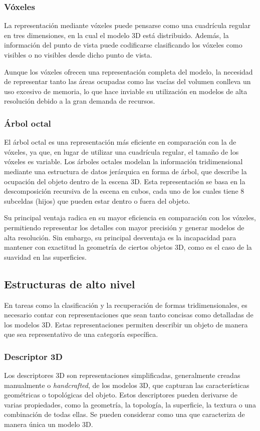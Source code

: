 \subsubsection{Vóxeles}
La representación mediante vóxeles puede pensarse como una cuadrícula regular en tres dimensiones, en la cual el modelo 3D está distribuido. Además, la información del punto de vista puede codificarse clasificando los vóxeles como visibles o no visibles desde dicho punto de vista.

Aunque los vóxeles ofrecen una representación completa del modelo, la necesidad de representar tanto las áreas ocupadas como las vacías del volumen conlleva un uso excesivo de memoria, lo que hace inviable su utilización en modelos de alta resolución debido a la gran demanda de recursos.

\subsubsection{Árbol octal}
El árbol octal es una representación más eficiente en comparación con la de vóxeles, ya que, en lugar de utilizar una cuadrícula regular, el tamaño de los vóxeles es variable. Los árboles octales modelan la información tridimensional mediante una estructura de datos jerárquica en forma de árbol, que describe la ocupación del objeto dentro de la escena 3D. Esta representación se basa en la descomposición recursiva de la escena en cubos, cada uno de los cuales tiene 8 subceldas (hijos) que pueden estar dentro o fuera del objeto.

Su principal ventaja radica en su mayor eficiencia en comparación con los vóxeles, permitiendo representar los detalles con mayor precisión y generar modelos de alta resolución. Sin embargo, su principal desventaja es la incapacidad para mantener con exactitud la geometría de ciertos objetos 3D, como es el caso de la suavidad en las superficies.

\subsection{Estructuras de alto nivel}
En tareas como la clasificación y la recuperación de formas tridimensionales, es necesario contar con representaciones que sean tanto concisas como detalladas de los modelos 3D. Estas representaciones permiten describir un objeto de manera que sea representativo de una categoría específica.

\subsubsection{Descriptor 3D}
Los descriptores 3D son representaciones simplificadas, generalmente creadas manualmente o \textit{handcrafted}, de los modelos 3D, que capturan las características geométricas o topológicas del objeto. Estos descriptores pueden derivarse de varias propiedades, como la geometría, la topología, la superficie, la textura o una combinación de todas ellas. Se pueden considerar como una  que caracteriza de manera única un modelo 3D.

